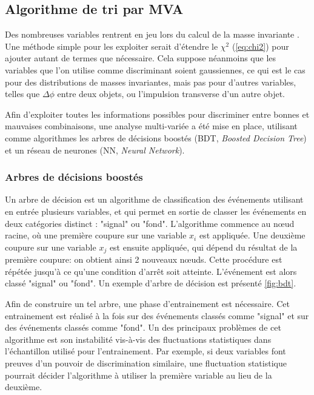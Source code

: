 \subsection{Algorithme de tri par MVA}

Des nombreuses variables rentrent en jeu lors du calcul de la masse invariante \ttbar. Une méthode simple pour les exploiter serait d'étendre le $\chi^2$ (\cref{eq:chi2}) pour ajouter autant de termes que nécessaire. Cela suppose néanmoins que les variables que l'on utilise comme discriminant soient gaussiennes, ce qui est le cas pour des distributions de masses invariantes, mais pas pour d'autres variables, telles que $\Delta \phi$ entre deux objets, ou l'impulsion transverse d'un autre objet.

Afin d'exploiter toutes les informations possibles pour discriminer entre bonnes et mauvaises combinaisons, une analyse multi-variée a été mise en place, utilisant comme algorithmes les arbres de décisions boostés (BDT, \emph{Boosted Decision Tree}) et un réseau de neurones (NN, \emph{Neural Network}).


\subsubsection{Arbres de décisions boostés}

Un arbre de décision est un algorithme de classification des événements utilisant en entrée plusieurs variables, et qui permet en sortie de classer les événements en deux catégories distinct : "signal" ou "fond". L'algorithme commence au nœud racine, où une première coupure sur une variable $x_i$ est appliquée. Une deuxième coupure sur une variable $x_j$ est ensuite appliquée, qui dépend du résultat de la première coupure: on obtient ainsi 2 nouveaux nœuds. Cette procédure est répétée jusqu'à ce qu'une condition d'arrêt soit atteinte. L'événement est alors classé "signal" ou "fond". Un exemple d'arbre de décision est présenté \cref{fig:bdt}.

Afin de construire un tel arbre, une phase d'entrainement est nécessaire. Cet entrainement est réalisé à la fois sur des événements classés comme "signal" et sur des événements classés comme "fond". Un des principaux problèmes de cet algorithme est son instabilité vis-à-vis des fluctuations statistiques dans l'échantillon utilisé pour l'entrainement. Par exemple, si deux variables font preuves d'un pouvoir de discrimination similaire, une fluctuation statistique pourrait décider l'algorithme à utiliser la première variable au lieu de la deuxième.


